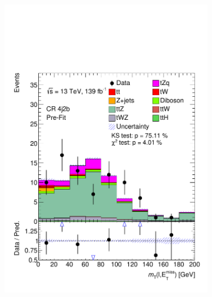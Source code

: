 \begin{figure}[!h]
\begin{subfigure}[b]{0.33\linewidth}
    \includegraphics[width=\linewidth]{ubonn-thesis/Chapters/Chapters_06/Figure/Input_distribution/CR_4j2b_mtW.pdf} 
  \end{subfigure} 
  \newline
  \vspace*{0.4cm}
  \begin{subfigure}[b]{0.33\linewidth}
    \centering

\end{subfigure}
\end{figure}
